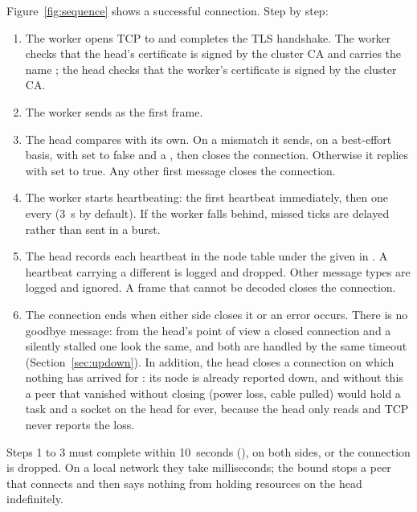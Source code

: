 \documentclass{article}
\begin{document}
Figure~\ref{fig:sequence} shows a successful connection. Step by step:

\begin{enumerate}
  \item The worker opens TCP to  and completes the TLS
    handshake. The worker checks that the head's certificate is signed by
    the cluster CA and carries the name ; the head
    checks that the worker's certificate is signed by the cluster CA.
  \item The worker sends  as the first frame.
  \item The head compares  with its own. On a
    mismatch it sends, on a best-effort basis,  with
     set to false and a , then closes the
    connection. Otherwise it replies with  set to true. Any
    other first message closes the connection.
  \item The worker starts heartbeating: the first heartbeat immediately,
    then one every  (3~s by default). If the
    worker falls behind, missed ticks are delayed rather than sent in a
    burst.
  \item The head records each heartbeat in the node table under the
     given in . A heartbeat carrying a different
     is logged and dropped. Other message types are logged
    and ignored. A frame that cannot be decoded closes the connection.
  \item The connection ends when either side closes it or an error occurs.
    There is no goodbye message: from the head's point of view a closed
    connection and a silently stalled one look the same, and both are
    handled by the same timeout (Section~\ref{sec:updown}). In addition,
    the head closes a connection on which nothing has arrived for
    : its node is already reported down, and
    without this a peer that vanished without closing (power loss, cable
    pulled) would hold a task and a socket on the head for ever, because
    the head only reads and TCP never reports the loss.
\end{enumerate}

Steps 1 to 3 must complete within 10~seconds (),
on both sides, or the connection is dropped. On a local network they take
milliseconds; the bound stops a peer that connects and then says nothing
from holding resources on the head indefinitely.
\end{document}
